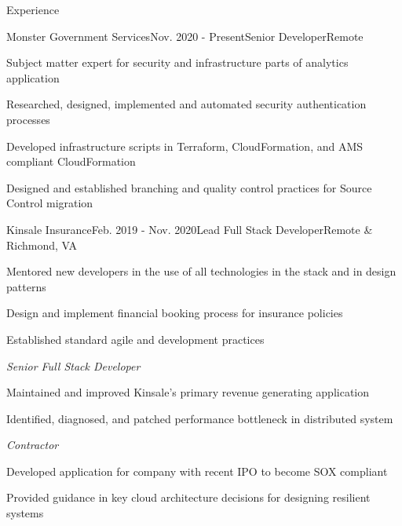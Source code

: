 \documentclass{resume} %
\begin{document}

\begin{rSection}{Experience}

	\begin{rSubsection}{Monster Government Services}{Nov. 2020 - Present}{\vspace{-0.5em}Senior Developer}{Remote}
		\item Subject matter expert for security and infrastructure parts of analytics application
		\item Researched, designed, implemented and automated security authentication processes
		\item Developed infrastructure scripts in  Terraform, CloudFormation, and AMS compliant CloudFormation
		\item Designed and established branching and quality control practices for Source Control migration
	\end{rSubsection}

	\begin{rSubsection}{Kinsale Insurance}{Feb. 2019 - Nov. 2020}{\vspace{-0.5em}Lead Full Stack Developer}{Remote \& Richmond, VA}
			\item Mentored new developers in the use of all technologies in the stack and in design patterns
			\item Design and implement financial booking process for insurance policies
			\item Established standard agile and development practices

	    \vspace{-0.5em}\setlength{\itemindent}{.0in}\emph{Senior Full Stack Developer}
	    	\item 	Maintained and improved Kinsale's primary revenue generating application
			\item Identified, diagnosed, and patched performance bottleneck in distributed system

		\vspace{-0.5em}\setlength{\itemindent}{.0in}\emph{Contractor}
			\item Developed application for company with recent IPO to become SOX compliant
			\item Provided guidance in key cloud architecture decisions for designing resilient systems



\end{rSubsection}
\end{rSection}
\end{document}
